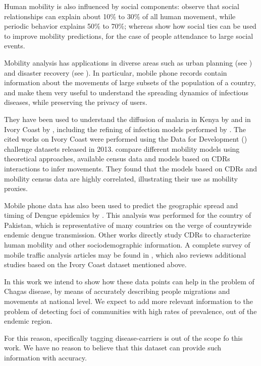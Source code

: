 Human mobility is also influenced by social components: \cite{cho2011friendship} observe that social relationships
can explain about 10\% to 30\% of all human movement, while periodic
behavior explains 50\% to 70\%; whereas \cite{ponieman2016mobility} show how social ties can be used to improve mobility predictions, for the case of people attendance to large social events.

Mobility analysis has applications in diverse areas such as urban planning (see \cite{wang2012understanding}) and disaster recovery (see \cite{lu2012predictability}).
In particular, mobile phone records contain information about the movements of large subsets of the population of a country, and make them very useful to understand the spreading dynamics of infectious diseases, while preserving the privacy of users.

They have been used to understand the diffusion of malaria in Kenya by \cite{wesolowski2012quantifying} and in Ivory Coast by \cite{enns2013human}, including the refining of infection models performed by \cite{chunara2013large}. The cited works on Ivory Coast were performed using the Data for Development (\cite{d4d}) challenge datasets released in 2013. \cite{tizzoni2014use} compare different mobility models using theoretical approaches, available census data and models based on CDRs interactions to infer movements. They found that the models based on CDRs and mobility census data are highly correlated, illustrating their use as mobility proxies.

Mobile phone data has also been used to predict the geographic spread and timing of Dengue epidemics by \cite{wesolowski2015impact}. This analysis was performed for the country of Pakistan, which is representative of many countries on the verge of countrywide endemic dengue transmission. Other works directly study CDRs to characterize human mobility and other sociodemographic information. A complete survey of mobile traffic analysis articles may be found in \cite{naboulsi2015mobile}, which also reviews additional studies based on the Ivory Coast dataset mentioned above.

In this work we intend to show how these data points can help in the problem of Chagas disease, by means of accurately describing people migrations and movements at national level.
We expect to add more relevant information to the problem of detecting foci of communities with high rates of prevalence, out of the endemic region.

For this reason, specifically tagging disease-carriers is out of the scope fo this work. 
We have no reason to believe that this dataset can provide such information with accuracy.

